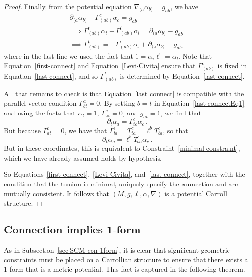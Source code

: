 \documentclass{article}
\theoremstyle{definition}
\theoremstyle{remark}
\begin{document}
\begin{proof}
Finally, from the potential equation $\nabla_{(a}\alpha_{b)}  = g_{ab}$, we have 
\begin{align} 
\partial_{(a}\alpha_{b)} - \Gamma^c_{(ab)}\alpha_c  = g_{ab} \label{last-connectEq1} \\
\implies \Gamma^t_{(ab)}\alpha_t + \Gamma^i_{(ab)}\alpha_i  = \partial_{(a}\alpha_{b)} - g_{ab} \nonumber \\
\implies  \Gamma^t_{(ab)}  = - \Gamma^i_{(ab)}\alpha_i + \partial_{(a}\alpha_{b)} - g_{ab}, \label{last connect}
\end{align}
where in the last line we used the fact that $1 = \alpha_i\ell^i = \alpha_t$. Note that Equation~\ref{first-connect} and Equation~\ref{Levi-Civita} ensure that $\Gamma^i_{(ab)}$ is fixed in Equation~\ref{last connect}, and so $\Gamma^t_{(ab)}$ is determined by Equation~\ref{last connect}.

All that remains to check is that Equation~\ref{last connect} is compatible with the parallel vector condition $\Gamma^a_{bt} = 0$. By setting $b = t$ in Equation~\ref{last-connectEq1} and using the facts that $\alpha_t = 1$, $\Gamma^c_{at} = 0$, and $g_{at} = 0$, we find that
$$\partial_t \alpha_a = \Gamma^c_{ta} \alpha_c \,.$$
But because $\Gamma^c_{at} = 0$, we have that $\Gamma^c_{ta} = T^c_{ta} = \ell^b T^c_{ba}$, so that
$$\partial_t \alpha_a = \ell^b T^c_{ba} \alpha_c\,.$$
But in these coordinates, this is equivalent to Constraint~\ref{minimal-constraint}, which we have already assumed holds by hypothesis.

So Equations~\ref{first-connect},~\ref{Levi-Civita}, and~\ref{last connect}, together with the condition that the torsion is minimal, uniquely specify the connection and are mutually consistent. It follows that $(M,g,\ell,\alpha,\nabla)$ is a potential Carroll structure.
\end{proof}



\subsection{Connection implies 1-form}
As in Subsection~\ref{sec:SCM-con-1form}, it is clear that significant geometric constraints must be placed on a Carrollian structure to ensure that there exists a 1-form that is a metric potential. This fact is captured in the following theorem.
\end{document}
